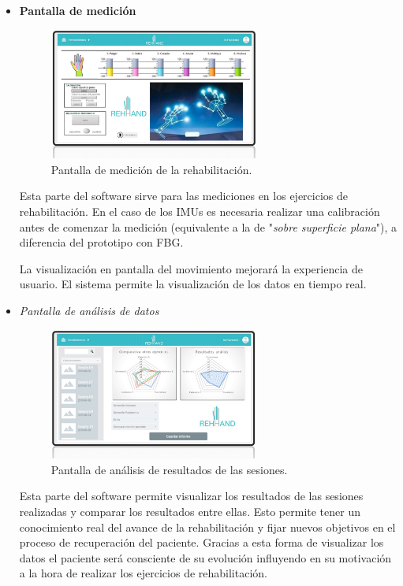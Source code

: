 \begin{itemize}
	\item \textbf{Pantalla de medición}
	
	\begin{figure}[H]
		\centering
		\includegraphics[width=0.65\textwidth]{./img/softwareIMU1}
		\caption{Pantalla de medición de la rehabilitación. } 
		\label{fig:softIMU1}
	\end{figure} 
	 
	 Esta parte del software sirve para las mediciones en los ejercicios de rehabilitación. En el caso de los IMUs es necesaria realizar una calibración antes de comenzar la medición (equivalente a la de "\textit{sobre superficie plana}"), a diferencia del prototipo con FBG.
	 
	 La visualización en pantalla del movimiento mejorará la experiencia de usuario. El sistema permite la visualización de los datos en tiempo real.
	
	\item \textit{Pantalla de análisis de datos}
	
	\begin{figure}[H]
		\centering
		\includegraphics[width=0.65\textwidth]{./img/softwareIMU2}
		\caption{Pantalla de análisis de resultados de las sesiones. } 
		\label{fig:softIMU2}
	\end{figure} 
	
	Esta parte del software permite visualizar los resultados de las sesiones realizadas y comparar los resultados entre ellas. Esto permite tener un conocimiento real del avance de la rehabilitación y fijar nuevos objetivos en el proceso de recuperación del paciente. Gracias a esta forma de visualizar los datos el paciente será consciente de su evolución influyendo en su motivación a la hora de realizar los ejercicios de rehabilitación.
 

\end{itemize}
